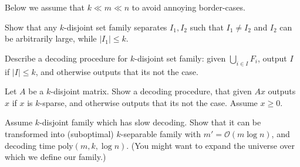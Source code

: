 \documentclass[12pt]{uebung}
\begin{document}
 

\newcommand{\bigo}{\mathcal{O}}
\renewcommand{\aufgname}{Exercise}

Below we assume that $k \ll m \ll n$ to avoid annoying border-cases.

\begin{aufg}
Show that any $k$-disjoint set family separates $I_1,I_2$ such that $I_1 \not= I_2$ and $I_2$ can be arbitrarily large, while $|I_1| \le k$.
\end{aufg}

\begin{aufg}
Describe a decoding procedure for $k$-disjoint set family: given $\bigcup_{i \in I} F_i$, output $I$ if $|I| \le k$, and otherwise outputs that its not the case.
\end{aufg}

\begin{aufg}
Let $A$ be a $k$-disjoint matrix.  Show a decoding procedure, that given $Ax$ outputs $x$ if $x$ is $k$-sparse, and otherwise outputs that its not the case. Assume $x \ge 0$.
\end{aufg}

\begin{aufg}[2 pts]
Assume $k$-disjoint family which has slow decoding. Show that it can be transformed into (suboptimal) $k$-separable family with $m' = \bigo(m \log n)$, and decoding time $\textrm{poly}(m,k,\log n)$. (You might want to expand the universe over which we define our family.)
\end{aufg}
\end{document}
